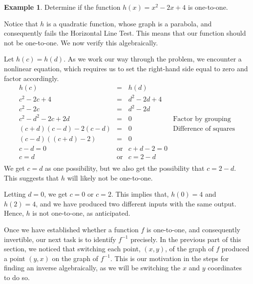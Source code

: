 \documentclass[12pt]{book}
\theoremstyle{definition}
\newtheorem{example}{Example}
\begin{document}
\begin{example} Determine if the function $h(x) = x^2 - 2x+4$ is one-to-one.\par
Notice that $h$ is a quadratic function, whose graph is a parabola, and consequently fails the Horizontal Line Test.  This means that our function should not be one-to-one.  We now verify this algebraically.\par
Let $h(c) = h(d)$.  As we work our way through the problem, we encounter a nonlinear equation, which requires us to set the right-hand side equal to zero and factor accordingly.
\[ \begin{array}{rcll}
h(c) & = & h(d) & \\
c^2 - 2c+4 & = & d^2 - 2d+4 & \\
c^2 - 2c & = & d^2 - 2d & \\
c^2 - d^2 - 2c + 2d & = & 0 & \mbox{Factor by grouping} \\
(c+d)(c-d) - 2(c-d) & = & 0 & \mbox{Difference of squares}\\
(c-d)((c+d) -2) & = & 0 & \\
c-d = 0 & \mbox{or} & c+d -2 = 0 & \\
c = d & \mbox{or} & c = 2-d & \\
\end{array} \]
We get $c=d$ as one possibility, but we also get the possibility that $c=2-d$.  This suggests that $h$ will likely not be one-to-one.\par
Letting $d=0$, we get $c = 0$ or $c = 2$.  This implies that, $h(0) = 4$ and $h(2) = 4$, and we have produced two different inputs with the same output.  Hence, $h$ is not one-to-one, as anticipated.
\end{example}
Once we have established whether a function $f$ is one-to-one, and consequently invertible, our next task is to identify $f^{-1}$ precisely.  In the previous part of this section, we noticed that switching each point, $(x,y)$, of the graph of $f$ produced a point $(y,x)$ on the graph of $f^{-1}$. This is our motivation in the steps for finding an inverse algebraically, as we will be switching the $x$ and $y$ coordinates to do so.
 \label{inverseprocedure}
\begin{center}
\end{center}
\end{document}

